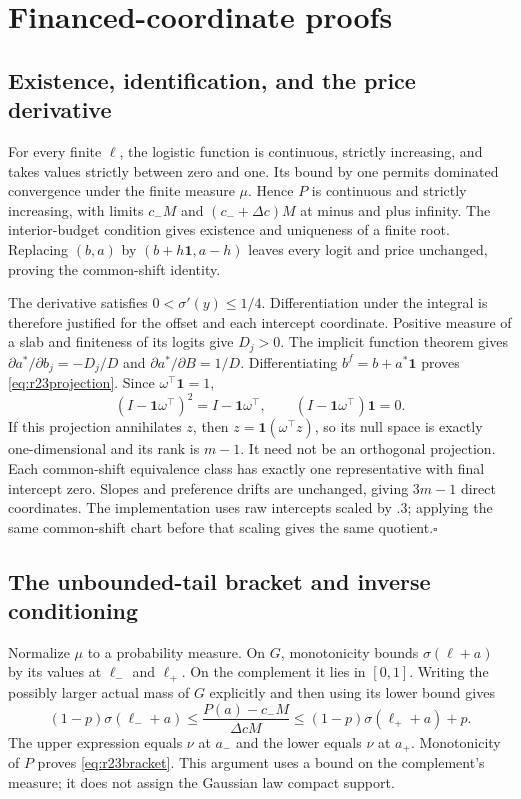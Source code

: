 \section{Financed-coordinate proofs}\label{app:r23budget}
\subsection{Existence, identification, and the price derivative}
For every finite $\ell$, the logistic function is continuous, strictly increasing, and takes values strictly between zero and one. Its bound by one permits dominated convergence under the finite measure $\mu$. Hence $P$ is continuous and strictly increasing, with limits $c_-M$ and $(c_-+\Delta c)M$ at minus and plus infinity. The interior-budget condition gives existence and uniqueness of a finite root. Replacing $(b,a)$ by $(b+h\mathbf1,a-h)$ leaves every logit and price unchanged, proving the common-shift identity.

The derivative satisfies $0<\sigma'(y)\leq1/4$. Differentiation under the integral is therefore justified for the offset and each intercept coordinate. Positive measure of a slab and finiteness of its logits give $D_j>0$. The implicit function theorem gives $\partial a^*/\partial b_j=-D_j/D$ and $\partial a^*/\partial B=1/D$. Differentiating $b^f=b+a^*\mathbf1$ proves \eqref{eq:r23projection}. Since $\omega^\top\mathbf1=1$,
\[
 (I-\mathbf1\omega^\top)^2=I-\mathbf1\omega^\top,
 \qquad (I-\mathbf1\omega^\top)\mathbf1=0.
\]
If this projection annihilates $z$, then $z=\mathbf1(\omega^\top z)$, so its null space is exactly one-dimensional and its rank is $m-1$. It need not be an orthogonal projection. Each common-shift equivalence class has exactly one representative with final intercept zero. Slopes and preference drifts are unchanged, giving $3m-1$ direct coordinates. The implementation uses raw intercepts scaled by $.3$; applying the same common-shift chart before that scaling gives the same quotient.\hfill$\square$

\subsection{The unbounded-tail bracket and inverse conditioning}
Normalize $\mu$ to a probability measure. On $G$, monotonicity bounds $\sigma(\ell+a)$ by its values at $\ell_-$ and $\ell_+$. On the complement it lies in $[0,1]$. Writing the possibly larger actual mass of $G$ explicitly and then using its lower bound gives
\[
 (1-p)\sigma(\ell_-+a)
 \leq \frac{P(a)-c_-M}{\Delta cM}
 \leq (1-p)\sigma(\ell_++a)+p.
\]
The upper expression equals $\nu$ at $a_-$ and the lower equals $\nu$ at $a_+$. Monotonicity of $P$ proves \eqref{eq:r23bracket}. This argument uses a bound on the complement's measure; it does not assign the Gaussian law compact support.

